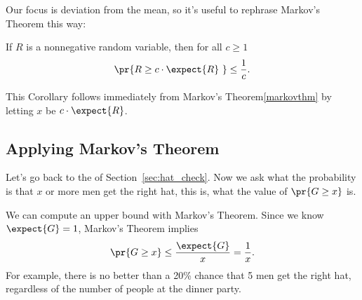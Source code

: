 \iffalse
We will show that $\expect{R} \geq x \pr{R \geq x}$.  Dividing
both sides by $x$ gives the desired result.

So let $I_x$ be the indicator variable for the event $[R \geq x]$, and
consider the random variable $x I_x$.  Note that
\[
R \geq x I_x,
\]
because at any sample point, $\omega$,
\begin{itemize}
\item if $R(\omega) \geq x$ then $R(\omega) \geq x = x\cdot 1 = x I_x(\omega)$, and
\item if $R(\omega) < x$ then $R(\omega) \geq 0 = x \cdot 0 = xI_x(\omega)$.
\end{itemize}
Therefore,
\begin{align*}
\expect{R} & \geq \expect{x I_x} & (\text{since } R \geq xI_x)\\
   & = x \expect{I_x} & \text{(linearity of $\expect{\cdot}$)}\\
   & = x \pr{I_x=1}  &  \text{($I_x$ is an indicator)}\\
   & = x \pr{R \geq x}.  &  (\text{def\ of $I_x$})
\end{align*}

\fi

Our focus is deviation from the mean, so it's useful to rephrase
Markov's Theorem this way:
\begin{corollary}
If $R$ is a nonnegative random variable, then for all $c \geq 1$
\begin{equation}
\pr{R \geq c \cdot \expect{R}\ }  \leq  \frac{1}{c}.\label{markovaboveemean}
\end{equation}
\end{corollary}
This Corollary follows immediately from Markov's Theorem\eqref{markovthm}
by letting $x$ be $c \cdot \expect{R}$.

\iffalse
This gives:
\[
\pr{R \geq c \cdot \expect{R}\ } \leq \frac{\expect{R}}{c \cdot \expect{R}} =
\frac{1}{c}.
\]
\end{proof}
\fi

\subsection{Applying Markov's Theorem}

Let's go back to the  of
Section~\ref{sec:hat_check}.  Now we ask what the probability is that
$x$ or more men get the right hat, this is, what the value of $\pr{G
  \geq x}$ is.

We can compute an upper bound with Markov's Theorem.  Since we know
$\expect{G}=1$, Markov's Theorem implies
\[
\pr{G \geq x} \leq \frac{\expect{G}}{x} = \frac{1}{x}.
\]
For example, there is no better than a 20\% chance that 5 men get the
right hat, regardless of the number of people at the dinner party.

